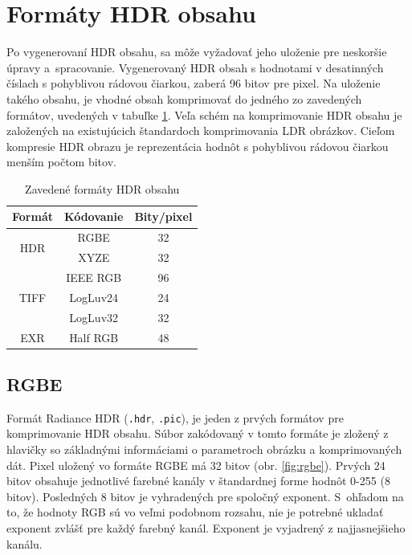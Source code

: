 \section{Formáty HDR obsahu} \label{section-formats}

Po vygenerovaní HDR obsahu, sa môže vyžadovať jeho uloženie pre neskoršie úpravy a~spracovanie. Vygenerovaný HDR obsah
s hodnotami v desatinných číslach s pohyblivou rádovou čiarkou, zaberá 96 bitov pre pixel. Na uloženie takého obsahu,
je vhodné obsah komprimovať do jedného zo zavedených formátov, uvedených v tabuľke \ref{table:formats}.
Veľa schém na komprimovanie HDR obsahu je založených na existujúcich štandardoch komprimovania LDR obrázkov.
Cieľom kompresie HDR obrazu je reprezentácia hodnôt s pohyblivou rádovou čiarkou menším počtom bitov.

\begin{table}[h!]
\centering
\begin{tabular}{||c|c|c||} 
  \hline
  Formát & Kódovanie & Bity/pixel \\
  \hline\hline
  \multirow{2}{4em}{HDR} 
  & RGBE & 32 \\ 
  & XYZE & 32 \\
  \hline
  \multirow{3}{4em}{TIFF} 
  & IEEE RGB & 96 \\
  & LogLuv24 & 24 \\
  & LogLuv32 & 32 \\
  \hline
  \multirow{1}{4em}{EXR} 
  & Half RGB & 48 \\
  \hline
\end{tabular}
\caption{Zavedené formáty HDR obsahu \cite{HDRI}}
\label{table:formats}
\end{table}

\subsection*{RGBE}

Formát Radiance HDR (\texttt{.hdr}, \texttt{.pic}), je jeden z prvých formátov pre komprimovanie HDR obsahu. 
Súbor zakódovaný v tomto formáte je zložený z hlavičky so základnými informáciami o parametroch obrázku a komprimovaných 
dát. Pixel uložený vo formáte RGBE má 32 bitov (obr. \ref{fig:rgbe}). Prvých 24 bitov obsahuje jednotlivé farebné kanály v štandardnej
forme hodnôt 0-255 (8 bitov). Posledných 8 bitov je vyhradených pre spoločný exponent. S~ohľadom na to, 
že hodnoty RGB sú vo veľmi podobnom rozsahu, nie je potrebné ukladať exponent zvlášť pre každý farebný kanál.
Exponent je vyjadrený z najjasnejšieho kanálu.

